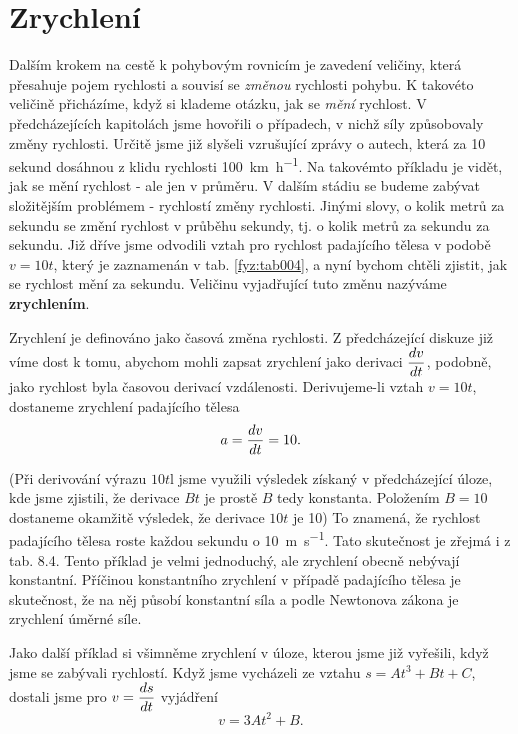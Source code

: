   \section{Zrychlení}
    Dalším krokem na cestě k pohybovým rovnicím je zavedení veličiny, která přesahuje pojem 
    rychlosti a souvisí se \emph{změnou} rychlosti pohybu. K takovéto veličině přicházíme, když si 
    klademe otázku, jak se \emph{mění} rychlost. V předcházejících kapitolách jsme hovořili o 
    případech, v nichž síly způsobovaly změny rychlosti. Určitě jsme již slyšeli vzrušující zprávy 
    o autech, která za \num{10} sekund dosáhnou z klidu rychlosti \SI{100}{km\per\hour}. Na 
    takovémto příkladu je vidět, jak se mění rychlost - ale jen v průměru. V dalším stádiu se 
    budeme zabývat složitějším problémem - rychlostí změny rychlosti. Jinými slovy, o kolik metrů 
    za sekundu se změní rychlost v průběhu sekundy, tj. o kolik metrů za sekundu za sekundu. Již 
    dříve jsme odvodili vztah pro rychlost padajícího tělesa v podobě \(v= 10 t\), který je 
    zaznamenán v tab. \ref{fyz:tab004}, a nyní bychom chtěli zjistit, jak se rychlost mění za 
    sekundu. Veličinu vyjadřující tuto změnu nazýváme \textbf{zrychlením}.
    
    Zrychlení je definováno jako časová změna rychlosti. Z předcházející diskuze již víme dost k 
    tomu, abychom mohli zapsat zrychlení jako derivaci \(\dfrac{d v}{d t}\), podobně, jako rychlost byla 
    časovou derivací vzdálenosti. Derivujeme-li vztah \(v= 10t\), dostaneme zrychlení padajícího 
    tělesa
    \begin{equation}\label{FYZ:eq101}
      a = \dfrac{d v}{d t} = 10.
    \end{equation}
    
    (Při derivování výrazu \(10t\)l jsme využili výsledek získaný v předcházející úloze, kde jsme 
    zjistili, že derivace \(Bt\) je prostě \(B\) tedy konstanta. Položením \(B=10\) dostaneme 
    okamžitě výsledek, že derivace \(10t\) je \num{10}) To znamená, že rychlost padajícího tělesa 
    roste každou sekundu o \SI{10}{\m\per\s}. Tato skutečnost je zřejmá i z tab. 8.4. Tento příklad 
    je velmi jednoduchý, ale zrychlení obecně nebývají konstantní. Příčinou konstantního zrychlení 
    v případě padajícího tělesa je skutečnost, že na něj působí konstantní síla a podle Newtonova 
    zákona je zrychlení úměrné síle.
    
    Jako další příklad si všimněme zrychlení v úloze, kterou jsme již vyřešili, když jsme se 
    zabývali rychlostí. Když jsme vycházeli ze vztahu \(s = At^3 + Bt + C\), dostali jsme pro 
    \(v=\dfrac{d s}{d t}\) vyjádření
    \begin{equation}\label{FYZ:eq102}
      v = 3At^2 + B.
    \end{equation}
    
